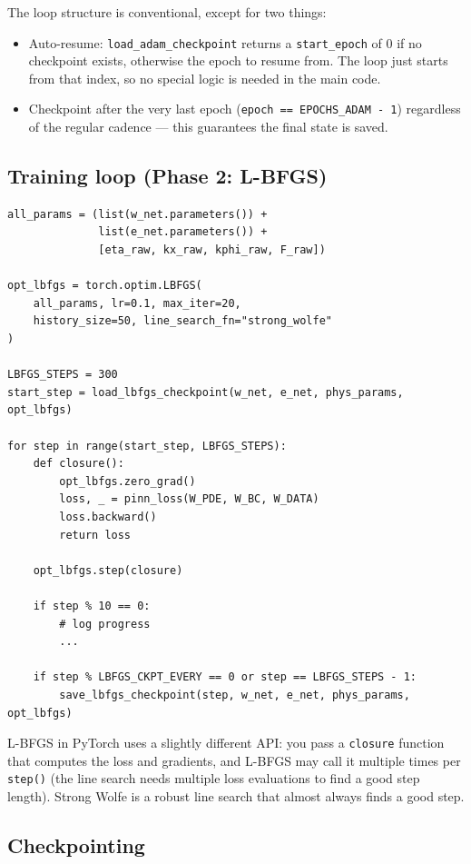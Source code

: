 \documentclass[11pt,a4paper]{article}
\begin{document}
The loop structure is conventional, except for two things:
\begin{itemize}[leftmargin=*, itemsep=2pt]
\item Auto-resume: \texttt{load\_adam\_checkpoint} returns a \texttt{start\_epoch} of 0 if no checkpoint exists, otherwise the epoch to resume from. The loop just starts from that index, so no special logic is needed in the main code.
\item Checkpoint after the very last epoch (\texttt{epoch == EPOCHS\_ADAM - 1}) regardless of the regular cadence --- this guarantees the final state is saved.
\end{itemize}

\subsection{Training loop (Phase 2: L-BFGS)}

\begin{lstlisting}[caption={L-BFGS refinement}]
all_params = (list(w_net.parameters()) +
              list(e_net.parameters()) +
              [eta_raw, kx_raw, kphi_raw, F_raw])

opt_lbfgs = torch.optim.LBFGS(
    all_params, lr=0.1, max_iter=20,
    history_size=50, line_search_fn="strong_wolfe"
)

LBFGS_STEPS = 300
start_step = load_lbfgs_checkpoint(w_net, e_net, phys_params, opt_lbfgs)

for step in range(start_step, LBFGS_STEPS):
    def closure():
        opt_lbfgs.zero_grad()
        loss, _ = pinn_loss(W_PDE, W_BC, W_DATA)
        loss.backward()
        return loss

    opt_lbfgs.step(closure)

    if step % 10 == 0:
        # log progress
        ...

    if step % LBFGS_CKPT_EVERY == 0 or step == LBFGS_STEPS - 1:
        save_lbfgs_checkpoint(step, w_net, e_net, phys_params, opt_lbfgs)
\end{lstlisting}

L-BFGS in PyTorch uses a slightly different API: you pass a \texttt{closure} function that computes the loss and gradients, and L-BFGS may call it multiple times per \texttt{step()} (the line search needs multiple loss evaluations to find a good step length). Strong Wolfe is a robust line search that almost always finds a good step.

\subsection{Checkpointing}
\end{document}
